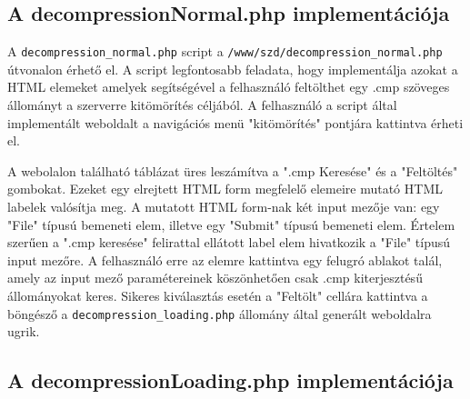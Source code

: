 \documentclass[oneside,titlepage,12pt,a4paper]{report}
\begin{document}
\subsection{A decompressionNormal.php implementációja}

A \texttt{decompression\_normal.php} script a \texttt{/www/szd/decompression\_normal.php} útvonalon érhető el. A script legfontosabb feladata, hogy implementálja azokat a HTML elemeket amelyek segítségével a felhasználó feltölthet egy .cmp szöveges állományt a szerverre kitömörítés céljából. A felhasználó a script által implementált weboldalt a navigációs menü "kitömörítés" pontjára kattintva érheti el. 
\par A webolalon található táblázat üres leszámítva a ".cmp Keresése" és a "Feltöltés" gombokat. Ezeket egy elrejtett HTML form megfelelő elemeire mutató HTML labelek valósítja meg. A mutatott HTML form-nak két input mezője van: egy "File" típusú bemeneti elem, illetve egy "Submit" típusú bemeneti elem. Értelem szerűen a ".cmp keresése" felirattal ellátott label elem hivatkozik a "File" típusú input mezőre. A felhasználó erre az elemre kattintva egy felugró ablakot talál, amely az input mező paramétereinek köszönhetően csak .cmp kiterjesztésű állományokat keres. Sikeres kiválasztás esetén a "Feltölt" cellára kattintva a böngésző a \texttt{decompression\_loading.php} állomány által generált weboldalra ugrik. 

\subsection{A decompressionLoading.php implementációja}
\end{document}
